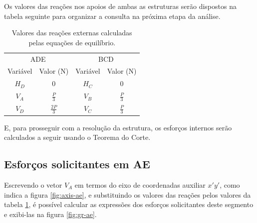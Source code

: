 \documentclass[12pt]{article}
\begin{document}
\bigskip
\bigskip

Os valores das reações nos apoios de ambas as estruturas serão dispostos na tabela seguinte para organizar a consulta na próxima etapa da análise.

\begin{table}[h!]
  \centering
  \begin{tabular}{cccc}
    \toprule
    \multicolumn{2}{c}{ADE} & \multicolumn{2}{c}{BCD}                                     \\
    Variável                & Valor (N)               & Variável    & Valor (N)           \\
    \midrule
    \large$H_D$             & \large 0                & \large$H_C$ & \large 0            \\[4pt]
    \large$V_A$             & \Large$\frac{P}{3}$     & \large$V_B$ & \Large$\frac{P}{3}$ \\[8pt]
    \large$V_D$             & \Large$\frac{2P}{3}$    & \large$V_C$ & \Large$\frac{P}{3}$ \\[8pt]
    \bottomrule
  \end{tabular}
  \caption{Valores das reações externas calculadas pelas equações de equilíbrio.}
  \label{tab:variaveis}
\end{table}

E, para prosseguir com a resolução da estrutura, os esforços internos serão calculados a seguir usando o Teorema do Corte.

\pagebreak

\subsection{Esforços solicitantes em AE}

Escrevendo o vetor $V_A$ em termos do eixo de coordenadas auxiliar $x'y'$, como indica a figura \ref{fig:axis-ae}, e substituindo os valores das reações pelos valores da tabela \ref{tab:variaveis}, é possível calcular as expressões dos esforços solicitantes deste segmento e exibi-las na figura \ref{fig:gr-ae}.

\bigskip
\end{document}
